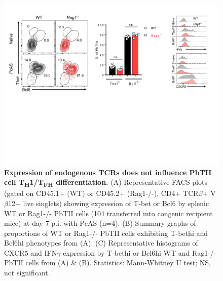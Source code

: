 \begin{figure}
    \centering
    \includegraphics[width=\textwidth]{"Fig S11 rev3"}
    \caption[Expression of endogenous TCRs does not influence PbTII cell T\textsubscript{H}\textnormal{1}/T\textsubscript{FH} differentiation]{\textbf{Expression of endogenous TCRs does not influence PbTII cell T\textsubscript{H}\textnormal{1}/T\textsubscript{FH} differentiation.} (A) Representative FACS plots (gated on CD45.1+ (WT) or CD45.2+ (Rag1-/-), CD4+ TCR\( \beta \)+ V\( \beta \)12+ live singlets) showing expression of T-bet or Bcl6 by splenic WT or Rag1-/- PbTII cells (104 transferred into congenic recipient mice) at day 7 p.i. with PcAS (n=4). (B) Summary graphs of proportions of WT or Rag1-/- PbTII cells exhibiting T-bethi and Bcl6hi phenotypes from (A). (C) Representative histograms of CXCR5 and IFN\( \gamma \) expression by T-bethi or Bcl6hi WT and Rag1-/- PbTII cells from (A) \& (B). Statistics: Mann-Whitney U test; NS, not significant.}
    \label{fig:ms11}
\end{figure}

